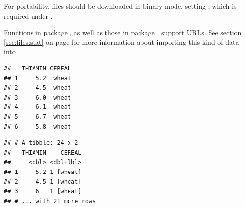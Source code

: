 \documentclass[krantz2]{krantz}\usepackage{knitr}
\begin{document}
\begin{warningbox}
For portability,  files should be downloaded in binary mode, setting , which is required under .
\end{warningbox}


\begin{knitrout}\footnotesize
{}\color{fgcolor}\begin{kframe}
\begin{alltt}
\hlstd{(}\hlstd{,}
              \hlstd{,}
               \hlstd{=} \hlstd{)}
\end{alltt}
\end{kframe}
\end{knitrout}

Functions in package , as well as those in package , support URLs. See section \ref{sec:files:stat} on page \pageref{sec:files:stat} for more information about importing this kind of data into \Rlang.

\begin{knitrout}\footnotesize
{}\color{fgcolor}\begin{kframe}
\begin{alltt}
 \hlkwb{<-}
  \hlstd{(} \hlstd{=} \hlstd{,}
             \hlstd{=} \hlstd{)}
\end{alltt}
\begin{verbatim}
##   THIAMIN CEREAL
## 1     5.2  wheat
## 2     4.5  wheat
## 3     6.0  wheat
## 4     6.1  wheat
## 5     6.7  wheat
## 6     5.8  wheat
\end{verbatim}
\end{kframe}
\end{knitrout}

\begin{knitrout}\footnotesize
{}\color{fgcolor}\begin{kframe}
\begin{alltt}
 \hlkwb{<-}
    \hlstd{(} \hlstd{=} \hlstd{)}
\end{alltt}
\begin{verbatim}
## # A tibble: 24 x 2
##   THIAMIN    CEREAL
##     <dbl> <dbl+lbl>
## 1     5.2 1 [wheat]
## 2     4.5 1 [wheat]
## 3     6   1 [wheat]
## # ... with 21 more rows
\end{verbatim}
\end{kframe}
\end{knitrout}
\end{document}
